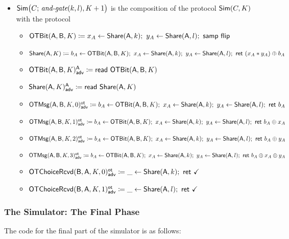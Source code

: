\begin{itemize}
\item $\mathsf{Sim}\big(C; \, \textit{and-gate}(k,l),K+1\big)$ is the composition of the protocol $\mathsf{Sim}(C,K)$ with the protocol
\begin{itemize}
\item $\OTBit(\A,\B,K) \coloneqq x_A \leftarrow \Share(\A,k); \ y_A \leftarrow \Share(\A,l); \ \samp{\flip}$
\item $\mathsf{Share}(\mathsf{A},K) \coloneqq b_A \leftarrow \mathsf{OTBit}(\mathsf{A},\mathsf{B},K); \ x_A \leftarrow \mathsf{Share}(\mathsf{A},k); \ y_A \leftarrow \mathsf{Share}(\mathsf{A},l); \ \mathsf{ret} \ (x_A * y_A) \oplus b_A$\medskip
\item {\color{blue} $\mathsf{OTBit}(\mathsf{A},\mathsf{B},K)^{\mathsf{A}}_{\mathsf{adv}} \coloneqq \mathsf{read} \ \mathsf{OTBit}(\mathsf{A},\mathsf{B},K)$}
\item {\color{blue} $\mathsf{Share}(\mathsf{A},K)^{\mathsf{A}}_{\mathsf{adv}} \coloneqq \mathsf{read} \ \mathsf{Share}(\mathsf{A},K)$}\medskip
\item {\color{blue} $\mathsf{OTMsg}(\mathsf{A},\mathsf{B},K,0)^{\mathsf{ot}}_{\mathsf{adv}} \coloneqq b_A \leftarrow \mathsf{OTBit}(\mathsf{A},\mathsf{B},K); \ x_A \leftarrow \mathsf{Share}(\mathsf{A},k); \ y_A \leftarrow \mathsf{Share}(\mathsf{A},l); \ \mathsf{ret} \ b_A$}
\item {\color{blue} $\mathsf{OTMsg}(\mathsf{A},\mathsf{B},K,1)^{\mathsf{ot}}_{\mathsf{adv}} \coloneqq b_A \leftarrow \mathsf{OTBit}(\mathsf{A},\mathsf{B},K); \ x_A \leftarrow \mathsf{Share}(\mathsf{A},k); \ y_A \leftarrow \mathsf{Share}(\mathsf{A},l); \ \mathsf{ret} \ b_A \oplus x_A$}
\item {\color{blue} $\mathsf{OTMsg}(\mathsf{A},\mathsf{B},K,2)^{\mathsf{ot}}_{\mathsf{adv}} \coloneqq b_A \leftarrow \mathsf{OTBit}(\mathsf{A},\mathsf{B},K); \ x_A \leftarrow \mathsf{Share}(\mathsf{A},k); \ y_A \leftarrow \mathsf{Share}(\mathsf{A},l); \ \mathsf{ret} \ b_A \oplus y_A$}
\item {\color{blue} $\mathsf{OTMsg}(\mathsf{A},\mathsf{B},K,3)^{\mathsf{ot}}_{\mathsf{adv}} \coloneqq b_A \leftarrow \mathsf{OTBit}(\mathsf{A},\mathsf{B},K); \ x_A \leftarrow \mathsf{Share}(\mathsf{A},k); \ y_A \leftarrow \mathsf{Share}(\mathsf{A},l); \ \mathsf{ret} \ b_A \oplus x_A \oplus y_A$}\medskip
\item {\color{blue} $\mathsf{OTChoiceRcvd}(\mathsf{B},\mathsf{A},K,0)^{\mathsf{ot}}_{\mathsf{adv}} \coloneqq \_ \leftarrow \mathsf{Share}(\mathsf{A},k); \ \mathsf{ret} \ \checkmark$}
\item {\color{blue} $\mathsf{OTChoiceRcvd}(\mathsf{B},\mathsf{A},K,1)^{\mathsf{ot}}_{\mathsf{adv}} \coloneqq \_ \leftarrow \mathsf{Share}(\mathsf{A},l); \ \mathsf{ret} \ \checkmark$}
\end{itemize}
\end{itemize}

\subsubsection{The Simulator: The Final Phase}
The code for the final part of the simulator is as follows:

